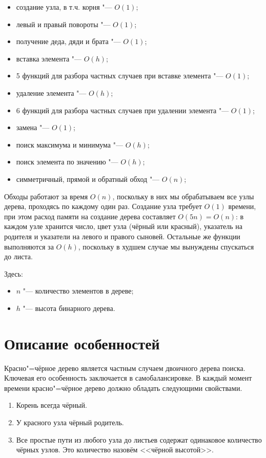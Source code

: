 \documentclass[otchet]{../SCWorks}
\begin{document}
\begin{itemize}
	\item создание узла, в т.ч. корня "--- $O(1)$;
	\item левый и правый повороты "--- $O(1)$;
	\item получение деда, дяди и брата "--- $O(1)$;
	\item вставка элемента "--- $O(h)$;
	\item 5 функций для разбора частных случаев при вставке элемента "--- $O(1)$;
	\item удаление элемента "--- $O(h)$;
	\item 6 функций для разбора частных случаев при удалении элемента "--- $O(1)$;
	\item замена "--- $O(1)$;
	\item поиск максимума и минимума "--- $O(h)$;
	\item поиск элемента по значению "--- $O(h)$;
	\item симметричный, прямой и обратный обход "--- $O(n)$;
\end{itemize}

Обходы работают за время $O(n)$, поскольку в них мы обрабатываем все узлы дерева, проходясь по каждому один раз. Создание узла требует $O(1)$ времени, при этом расход памяти на создание дерева составляет $O(5n) = O(n)$: в каждом узле хранится число, цвет узла (чёрный или красный), указатель на родителя и указатели на левого и правого сыновей. Остальные же функции выполняются за $O(h)$, поскольку в худшем случае мы вынуждены спускаться до листа.

Здесь:
\begin{itemize}
	\item[$\bullet$] $n$ "--- количество элементов в дереве;
	\item[$\bullet$] $h$ "--- высота бинарного дерева.
\end{itemize}

\section{Описание особенностей}

Красно"=чёрное дерево является частным случаем двоичного дерева поиска. Ключевая его особенность заключается в самобалансировке. В каждый момент времени красно"=чёрное дерево должно обладать следующими свойствами.

\begin{enumerate}
	\item Корень всегда чёрный.
	\item У красного узла чёрный родитель.
	\item Все простые пути из любого узла до листьев содержат одинаковое количество чёрных узлов. Это количество назовём <<чёрной высотой>>.
\end{enumerate}
\end{document}
